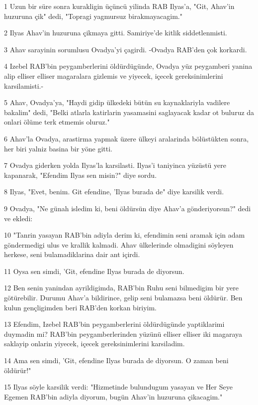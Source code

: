 \par 1 Uzun bir süre sonra kurakligin üçüncü yilinda RAB Ilyas'a, "Git, Ahav'in huzuruna çik" dedi, "Topragi yagmursuz birakmayacagim."
\par 2 Ilyas Ahav'in huzuruna çikmaya gitti. Samiriye'de kitlik siddetlenmisti.
\par 3 Ahav sarayinin sorumlusu Ovadya'yi çagirdi. -Ovadya RAB'den çok korkardi.
\par 4 Izebel RAB'bin peygamberlerini öldürdügünde, Ovadya yüz peygamberi yanina alip elliser elliser magaralara gizlemis ve yiyecek, içecek gereksinimlerini karsilamisti.-
\par 5 Ahav, Ovadya'ya, "Haydi gidip ülkedeki bütün su kaynaklariyla vadilere bakalim" dedi, "Belki atlarla katirlarin yasamasini saglayacak kadar ot buluruz da onlari ölüme terk etmemis oluruz."
\par 6 Ahav'la Ovadya, arastirma yapmak üzere ülkeyi aralarinda bölüstükten sonra, her biri yalniz basina bir yöne gitti.
\par 7 Ovadya giderken yolda Ilyas'la karsilasti. Ilyas'i taniyinca yüzüstü yere kapanarak, "Efendim Ilyas sen misin?" diye sordu.
\par 8 Ilyas, "Evet, benim. Git efendine, 'Ilyas burada de" diye karsilik verdi.
\par 9 Ovadya, "Ne günah isledim ki, beni öldürsün diye Ahav'a gönderiyorsun?" dedi ve ekledi:
\par 10 "Tanrin yasayan RAB'bin adiyla derim ki, efendimin seni aramak için adam göndermedigi ulus ve krallik kalmadi. Ahav ülkelerinde olmadigini söyleyen herkese, seni bulamadiklarina dair ant içirdi.
\par 11 Oysa sen simdi, 'Git, efendine Ilyas burada de diyorsun.
\par 12 Ben senin yanindan ayrildigimda, RAB'bin Ruhu seni bilmedigim bir yere götürebilir. Durumu Ahav'a bildirince, gelip seni bulamazsa beni öldürür. Ben kulun gençligimden beri RAB'den korkan biriyim.
\par 13 Efendim, Izebel RAB'bin peygamberlerini öldürdügünde yaptiklarimi duymadin mi? RAB'bin peygamberlerinden yüzünü elliser elliser iki magaraya saklayip onlarin yiyecek, içecek gereksinimlerini karsiladim.
\par 14 Ama sen simdi, 'Git, efendine Ilyas burada de diyorsun. O zaman beni öldürür!"
\par 15 Ilyas söyle karsilik verdi: "Hizmetinde bulundugum yasayan ve Her Seye Egemen RAB'bin adiyla diyorum, bugün Ahav'in huzuruna çikacagim."
